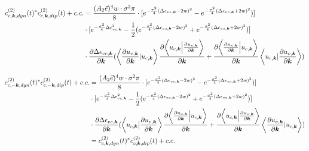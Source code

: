 \begin{equation}
\begin{aligned}
    c^{(2)}_{c,\boldsymbol k,dyn}(t)^* c^{(2)}_{c,\boldsymbol k,dip}(t)+c.c. &=\frac{(A_2 \vec e)^4 w \cdot \sigma^2 \pi}{8}  \cdot [e^{-\frac{\sigma^2}{4} (\Delta \epsilon_{vc,\boldsymbol k}-2w)^2}-e^{-\frac{\sigma^2}{4} (\Delta \epsilon_{vc,\boldsymbol k}+2w)^2})]\\
    &\cdot [e^{-\frac{\sigma^2}{4} \Delta \epsilon_{vc,\boldsymbol k} ^2}-\frac{1}{2}(e^{-\frac{\sigma^2}{4} (\Delta \epsilon_{vc,\boldsymbol k}-2w)^2}+e^{-\frac{\sigma^2}{4} (\Delta \epsilon_{vc,\boldsymbol k}+2w)^2})]\\
   & \cdot \frac{\partial  \Delta \epsilon_{vc,\boldsymbol k}}{\partial \boldsymbol k} 
   (\left \langle \frac{\partial u_{v,\boldsymbol k}}{\partial \boldsymbol k} |  u_{c,\boldsymbol k} \right \rangle \frac{\partial{\left \langle u_{c,\boldsymbol k}\Big |\frac{\partial u_{v,\boldsymbol k}}{\partial \boldsymbol k} \right \rangle}}{\partial {\boldsymbol k}}+
   \frac{\partial{\left \langle \frac{\partial u_{v,\boldsymbol k}}{\partial \boldsymbol k} \Big |u_{c,\boldsymbol k} \right \rangle}}{\partial {\boldsymbol k}} 
    \left \langle  u_{c,\boldsymbol k}| \frac{\partial u_{v,\boldsymbol k}}{\partial \boldsymbol k} \right \rangle )\\
\end{aligned}
\end{equation}

\begin{equation}
\begin{aligned}
    c^{(2)}_{c,-\boldsymbol k,dyn}(t)^* c^{(2)}_{c,-\boldsymbol k,dip}(t)+c.c. &=\frac{(A_2 \vec e)^4 w \cdot \sigma^2 \pi}{8}  \cdot [e^{-\frac{\sigma^2}{4} (\Delta \epsilon_{vc,\boldsymbol k}-2w)^2}-e^{-\frac{\sigma^2}{4} (\Delta \epsilon_{vc,\boldsymbol k}+2w)^2})]\\
    &\cdot [e^{-\frac{\sigma^2}{4} \Delta \epsilon_{vc,\boldsymbol k} ^2}-\frac{1}{2}(e^{-\frac{\sigma^2}{4} (\Delta \epsilon_{vc,\boldsymbol k}-2w)^2}+e^{-\frac{\sigma^2}{4} (\Delta \epsilon_{vc,\boldsymbol k}+2w)^2})]\\
   & \cdot \frac{\partial  \Delta \epsilon_{vc,\boldsymbol k}}{\partial \boldsymbol k} 
   (\left \langle u_{c,\boldsymbol k} \big | \frac{\partial u_{v,\boldsymbol k}}{\partial \boldsymbol k}  \right \rangle \frac{\partial{\left \langle\frac{\partial u_{v,\boldsymbol k}}{\partial \boldsymbol k}\Big |u_{c,\boldsymbol k}\right \rangle}}{\partial {\boldsymbol k}} +
   \frac{\partial{\left \langle u_{c,\boldsymbol k}\Big |\frac{\partial u_{v,\boldsymbol k}}{\partial \boldsymbol k} \right \rangle}}{\partial {\boldsymbol k}}
    \left \langle \frac{\partial u_{v,\boldsymbol k}}{\partial \boldsymbol k} |  u_{c,\boldsymbol k} \right \rangle)\\
   &=c^{(2)}_{c,\boldsymbol k,dyn}(t)^* c^{(2)}_{c,\boldsymbol k,dip}(t)+c.c.
\end{aligned}
\end{equation}

